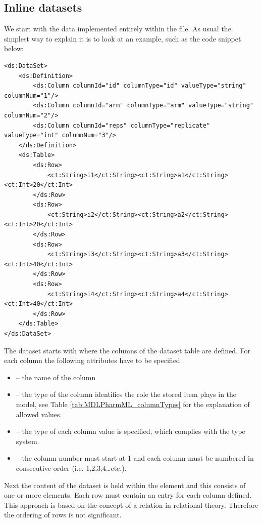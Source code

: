\subsection{Inline datasets}
\label{subsec:inlineDataset}
We start with the data implemented entirely within the \pml file. As usual 
the simplest way to explain it is to look at an example, such as the code 
snippet below:
\lstset{language=XML}
\begin{lstlisting}
<ds:DataSet>
    <ds:Definition>
        <ds:Column columnId="id" columnType="id" valueType="string" columnNum="1"/>
        <ds:Column columnId="arm" columnType="arm" valueType="string" columnNum="2"/>
        <ds:Column columnId="reps" columnType="replicate" valueType="int" columnNum="3"/>
    </ds:Definition>
    <ds:Table>
        <ds:Row>
            <ct:String>i1</ct:String><ct:String>a1</ct:String><ct:Int>20</ct:Int>
        </ds:Row>
        <ds:Row>
            <ct:String>i2</ct:String><ct:String>a2</ct:String><ct:Int>20</ct:Int>
        </ds:Row>
        <ds:Row>
            <ct:String>i3</ct:String><ct:String>a3</ct:String><ct:Int>40</ct:Int>
        </ds:Row>
        <ds:Row>
            <ct:String>i4</ct:String><ct:String>a4</ct:String><ct:Int>40</ct:Int>
        </ds:Row>
    </ds:Table>
</ds:DataSet>
\end{lstlisting}
%
The dataset starts with  where the columns of the
dataset table are defined. For each column the following attributes have to be 
specified
\begin{itemize} 
\item
{} -- the name of the column  
\item
{} --  the type of the column identifies 
the role the stored item plays in the model, see Table \ref{tab:MDLPharmML_columnTypes}
for the explanation of allowed values.  

\item
{} -- the type of each column value is specified, which
complies with the \pharmml type system.  
\item
{} -- the column number must start at 1 and each
column must be numbered in consecutive order (i.e.\xspace 1,2,3,4\ldots etc.). 
\end{itemize}
Next the content of the dataset is held within the  element and 
this consists of one or more  elements. Each row must contain 
an entry for each column defined. This approach is based on the concept of 
a relation in relational theory. Therefore the ordering of rows is not significant. 

